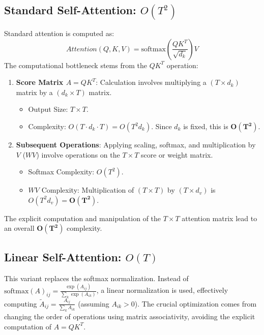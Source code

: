 \documentclass{article}
\begin{document}
\subsection*{Standard Self-Attention: $O(T^2)$}
Standard attention is computed as:
\[
Attention(Q, K, V) = \text{softmax}\left(\frac{QK^T}{\sqrt{d_k}}\right) V
\]
The computational bottleneck stems from the $QK^T$ operation:
\begin{enumerate}
    \item \textbf{Score Matrix $A = QK^T$}: Calculation involves multiplying a $(T \times d_k)$ matrix by a $(d_k \times T)$ matrix.
    \begin{itemize}
        \item Output Size: $T \times T$.
        \item Complexity: $O(T \cdot d_k \cdot T) = O(T^2 d_k)$. Since $d_k$ is fixed, this is $\boldsymbol{O(T^2)}$.
    \end{itemize}
    \item \textbf{Subsequent Operations}: Applying scaling, softmax, and multiplication by $V$ ($W V$) involve operations on the $T \times T$ score or weight matrix.
    \begin{itemize}
        \item Softmax Complexity: $O(T^2)$.
        \item $WV$ Complexity: Multiplication of $(T \times T)$ by $(T \times d_v)$ is $O(T^2 d_v) = \boldsymbol{O(T^2)}$.
    \end{itemize}
\end{enumerate}
The explicit computation and manipulation of the $T \times T$ attention matrix lead to an overall $\boldsymbol{O(T^2)}$ complexity.

\subsection*{Linear Self-Attention: $O(T)$}
This variant replaces the softmax normalization. Instead of $\text{softmax}(A)_{ij} = \frac{\exp(A_{ij})}{\sum_k \exp(A_{ik})}$, a linear normalization is used, effectively computing $\tilde{A}_{ij} = \frac{A_{ij}}{\sum_k A_{ik}}$ (assuming $A_{ik} > 0$). The crucial optimization comes from changing the order of operations using matrix associativity, avoiding the explicit computation of $A = QK^T$.\\
\end{document}
